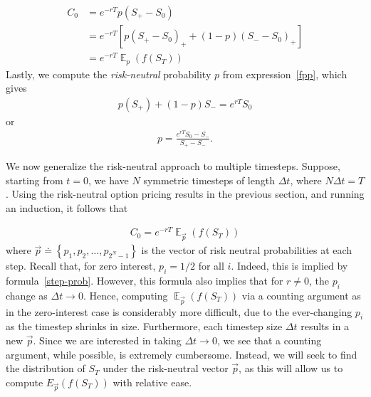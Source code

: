 \documentclass[12pt]{amsbook}
\DeclareMathOperator{\ex}{\mathbb{E}}
\theoremstyle{plain}
\theoremstyle{definition}
\theoremstyle{remark}
\numberwithin{equation}{section}  %
\begin{document}
\begin{equation*}
	\begin{split}
		C_{0} &= e^{-rT} p (S_{+} - S_{0})
		\\
		& = e^{-rT}\left[ p {(S_{+} - S_{0})}_{+}+(1-p){(S_{-} - S_{0})}_{+}\right]
		\\
		& = e^{-rT} \ex_{p}(f(S_{T}))
	\end{split}
\end{equation*}
Lastly, we compute the \emph{risk-neutral} probability $p$ from expression~\eqref{fpp}, which gives
\begin{equation*}
	\begin{split}
		p(S_{+}) + (1 -p)S_{-} = e^{rT} S_{0}
	\end{split}
\end{equation*}
or
\begin{equation}\label{step-prob}
	\begin{split}
		p = \frac{e^{rT} S_{0} - S_{-}}{S_{+} - S_{-}}.
	\end{split}
\end{equation}

We now generalize the risk-neutral approach to multiple timesteps. Suppose, starting from $t=0$, we have $N$ symmetric timesteps of length $\Delta t$, where
$N \Delta t  = T$. Using the risk-neutral option pricing
results in the previous section, and running an induction,
it follows that 

\begin{equation}\label{ui}
	\begin{split}
		C_{0} = e^{-rT} \ex_{\vec{p}}(f(S_{T}))
	\end{split}
\end{equation}
where $\vec{p} \doteq \left\{ p_{1}, p_{2}, \ldots, p_{2^{N} -1} \right\}$
is the vector of risk neutral probabilities at each step.
Recall that, for zero interest, 
$p_{i} = 1/2$ for all $i$. Indeed, this is implied by
formula~\eqref{step-prob}. However, this formula also implies that
for $r \neq 0$, the $p_i$ change as $\Delta t \to 0$. 
Hence, computing $\ex_{\vec{p}}(f(S_{T}))$ via a counting argument as
in the zero-interest case is considerably more difficult, due to the
ever-changing $p_i$ as the timestep shrinks in size. Furthermore,
each timestep size $\Delta t$ results in a new $\vec{p}$.
Since we are interested in taking $\Delta t \to 0$, we see that a counting
argument, while possible, is extremely cumbersome.
Instead, we will seek to find the distribution of $S_{T}$ under
the risk-neutral vector $\vec{p}$, as this will allow us to compute
$E_{\vec{p}} (f(S_{T}))$ with relative ease. 
\end{document}
